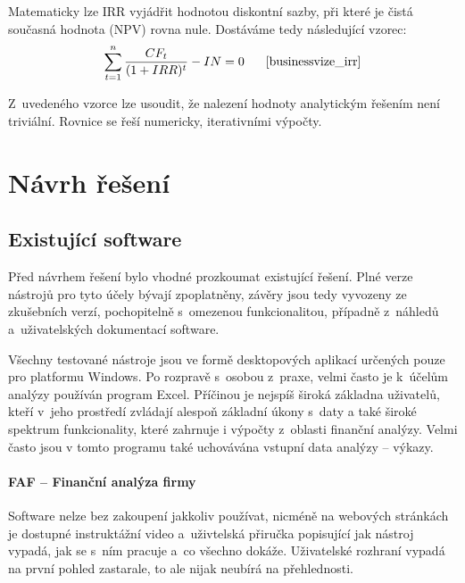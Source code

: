 Matematicky lze IRR vyjádřit hodnotou diskontní sazby, při které je čistá současná hodnota (NPV) rovna nule. Dostáváme tedy následující vzorec:
$$\sum\limits_{t=1}^{n} \dfrac{CF_t}{(1+IRR)^t} - IN = 0 \scite{businessvize_irr}$$

Z~uvedeného vzorce lze usoudit, že nalezení hodnoty analytickým řešením není triviální. Rovnice se řeší numericky, iterativními výpočty.








































\chapter{Návrh řešení}



\section{Existující software}
Před návrhem řešení bylo vhodné prozkoumat existující řešení. Plné verze nástrojů pro tyto účely bývají zpoplatněny, závěry jsou tedy vyvozeny ze zkušebních verzí, pochopitelně s~omezenou funkcionalitou, případně z~náhledů a~uživatelských dokumentací software.

Všechny testované nástroje jsou ve formě desktopových aplikací určených pouze pro platformu Windows. Po rozpravě s~osobou z~praxe, velmi často je k~účelům analýzy používán program Excel. Příčinou je nejspíš široká základna uživatelů, kteří v~jeho prostředí zvládají alespoň základní úkony s~daty a také široké spektrum funkcionality, které zahrnuje i výpočty z~oblasti finanční analýzy. Velmi často jsou v tomto programu také uchovávána vstupní data analýzy -- výkazy.

\subsubsection{FAF -- Finanční analýza firmy}
Software nelze bez zakoupení jakkoliv používat, nicméně na webových stránkách je dostupné instruktážní video a~uživtelská přiručka popisující jak nástroj vypadá, jak se s~ním pracuje a~co všechno dokáže. Uživatelské rozhraní vypadá na první pohled zastarale, to ale nijak neubírá na přehlednosti.


